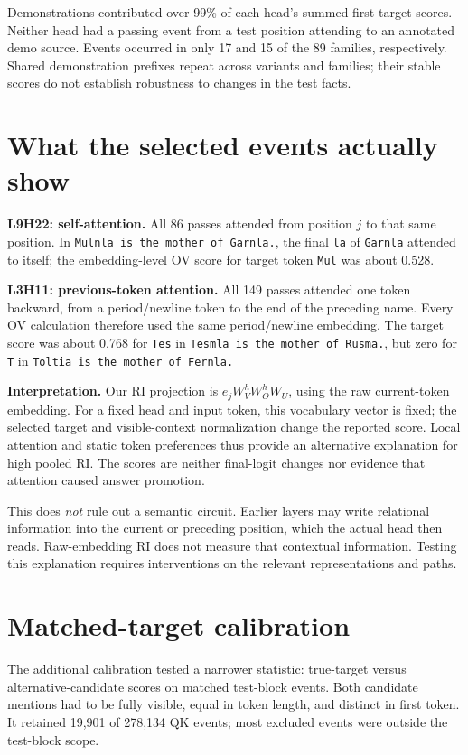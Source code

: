 \documentclass[11pt,a4paper]{article}
\begin{document}
Demonstrations contributed over 99\% of each head's summed first-target scores. Neither head had a passing event from a test position attending to an annotated demo source. Events occurred in only 17 and 15 of the 89 families, respectively. Shared demonstration prefixes repeat across variants and families; their stable scores do not establish robustness to changes in the test facts.

\section{What the selected events actually show}
\textbf{L9H22: self-attention.} All 86 passes attended from position $j$ to that same position. In \texttt{Mulnla is the mother of Garnla.}, the final \texttt{la} of \texttt{Garnla} attended to itself; the embedding-level OV score for target token \texttt{Mul} was about 0.528.

\textbf{L3H11: previous-token attention.} All 149 passes attended one token backward, from a period/newline token to the end of the preceding name. Every OV calculation therefore used the same period/newline embedding. The target score was about 0.768 for \texttt{Tes} in \texttt{Tesmla is the mother of Rusma.}, but zero for \texttt{T} in \texttt{Toltia is the mother of Fernla.}

\textbf{Interpretation.} Our RI projection is $e_jW_V^hW_O^hW_U$, using the raw current-token embedding. For a fixed head and input token, this vocabulary vector is fixed; the selected target and visible-context normalization change the reported score. Local attention and static token preferences thus provide an alternative explanation for high pooled RI. The scores are neither final-logit changes nor evidence that attention caused answer promotion.

This does \emph{not} rule out a semantic circuit. Earlier layers may write relational information into the current or preceding position, which the actual head then reads. Raw-embedding RI does not measure that contextual information. Testing this explanation requires interventions on the relevant representations and paths.

\section{Matched-target calibration}
The additional calibration tested a narrower statistic: true-target versus alternative-candidate scores on matched test-block events. Both candidate mentions had to be fully visible, equal in token length, and distinct in first token. It retained 19,901 of 278,134 QK events; most excluded events were outside the test-block scope.
\end{document}
